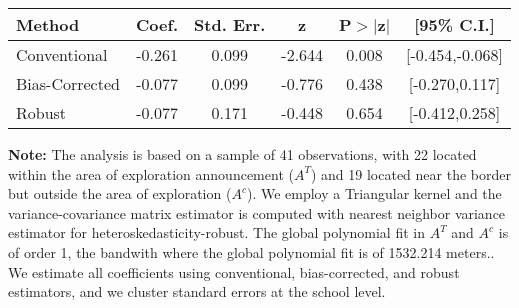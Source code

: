 \begin{table}[htbp]\centering
 \footnotesize 
\begin{tabular}{lccccc}
\hline\hline
Method & Coef. & Std. Err. & z & P$>|$z$|$ & [95\% C.I.] \\ 
\hline \hline  
Conventional & -0.261 & 0.099 & -2.644 & 0.008 & [-0.454,-0.068] \\ 
 Bias-Corrected & -0.077 & 0.099 & -0.776 & 0.438 & [-0.270,0.117] \\ 
Robust & -0.077 & 0.171 & -0.448 & 0.654 & [-0.412,0.258] \\ 
  \hline\hline
\end{tabular}
\label{table:rd}
\begin{tablenotes} 
  \justifying \tiny \textbf{Note: }    
   The analysis is based on a sample of 41 observations, with 22 located within the area of exploration announcement ($A^{T}$) and 19 located near the border but outside the area of exploration  ($A^{c}$). 
           We employ a Triangular kernel and the variance-covariance matrix estimator is computed with nearest neighbor variance estimator for heteroskedasticity-robust. The global polynomial fit in  $A^{T}$ and $A^{c}$ is of order 1, the bandwith where the global polynomial fit is of 1532.214 meters.. We estimate all coefficients using conventional, bias-corrected, and robust estimators, and we cluster standard errors at the school level. \end{tablenotes} 
 \end{table} 
